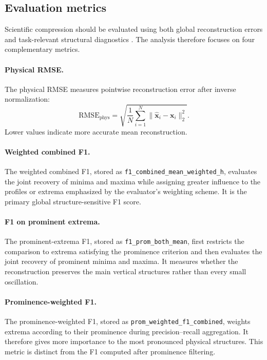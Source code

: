 \documentclass[11pt]{article}
\newcommand{\x}{\mathbf{x}}
\newcommand{\xh}{\widehat{\mathbf{x}}}
\begin{document}
\subsection{Evaluation metrics}

Scientific compression should be evaluated using both global reconstruction errors and task-relevant structural diagnostics \cite{di2025survey,gomes2025lossy,mirowski2024neural,li2025machine}. The analysis therefore focuses on four complementary metrics.

\paragraph{Physical RMSE.}
The physical RMSE measures pointwise reconstruction error after inverse normalization:
\begin{equation}
    \mathrm{RMSE}_{\mathrm{phys}}
    =
    \sqrt{
    \frac{1}{N}
    \sum_{i=1}^{N}
    \|\xh_i-\x_i\|_2^2
    }.
\end{equation}
Lower values indicate more accurate mean reconstruction.

\paragraph{Weighted combined F1.}
The weighted combined F1, stored as
\nolinkurl{f1_combined_mean_weighted_h}, evaluates the joint recovery of minima and maxima while assigning greater influence to the profiles or extrema emphasized by the evaluator's weighting scheme. It is the primary global structure-sensitive F1 score.

\paragraph{F1 on prominent extrema.}
The prominent-extrema F1, stored as
\nolinkurl{f1_prom_both_mean}, first restricts the comparison to extrema satisfying the prominence criterion and then evaluates the joint recovery of prominent minima and maxima. It measures whether the reconstruction preserves the main vertical structures rather than every small oscillation.

\paragraph{Prominence-weighted F1.}
The prominence-weighted F1, stored as
\nolinkurl{prom_weighted_f1_combined}, weights extrema according to their prominence during precision--recall aggregation. It therefore gives more importance to the most pronounced physical structures. This metric is distinct from the F1 computed after prominence filtering.
\end{document}
